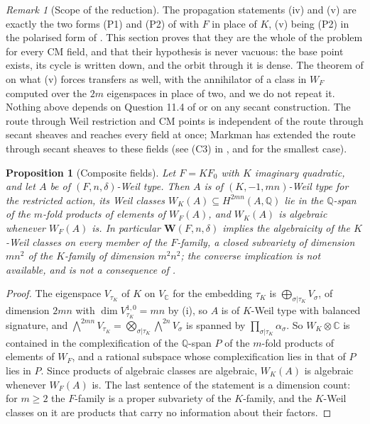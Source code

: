 \documentclass[11pt,reqno]{amsart}
\theoremstyle{plain}
\newtheorem{proposition}[theorem]{Proposition}
\theoremstyle{definition}
\theoremstyle{remark}
\newtheorem{remark}[theorem]{Remark}
\newcommand{\QQ}{\mathbb{Q}}
\newcommand{\CC}{\mathbb{C}}
\begin{document}
\begin{remark}[Scope of the reduction]\label{rem:cmwhatisnew}
The propagation statements (iv) and (v) are exactly the two forms (P1) and
(P2) of \cite[Remark~3.7]{paperII} with $F$ in place of $K$, (v) being (P2) in the
polarised form of \cite[Remark~3.6]{paperII}. This section proves that they are the
whole of the problem for every CM field, and that their hypothesis is never
vacuous: the base point exists, its cycle is written down, and the orbit
through it is dense. The theorem of \cite[Theorem~2.5]{paperII} on what (v) forces
transfers as well, with the annihilator of a class in $W_{F}$ computed over
the $2m$ eigenspaces in place of two, and we do not repeat it. Nothing above
depends on Question 11.4 of \cite{Mar25b} or on any secant construction. The
route through Weil restriction and CM points is independent of the route
through secant sheaves and reaches every field at once; Markman has extended
the route through secant sheaves to these fields \cite{Mar25c} (see (C3) in
\cite[Section~2.5]{paperIII}, and \cite[Section~5.2]{paperII} for the smallest case).
\end{remark}

\begin{proposition}[Composite fields]\label{prop:composite}
Let $F=KF_{0}$ with $K$ imaginary quadratic, and let $A$ be of
$(F,n,\delta)$-Weil type. Then $A$ is of $(K,-1,mn)$-Weil type for the
restricted action, its Weil classes $W_{K}(A)\subseteq H^{2mn}(A,\QQ)$ lie in
the $\QQ$-span of the $m$-fold products of elements of $W_{F}(A)$, and
$W_{K}(A)$ is algebraic whenever $W_{F}(A)$ is. In particular
$\mathbf{W}(F,n,\delta)$ implies the algebraicity of the $K$-Weil classes on
every member of the $F$-family, a closed subvariety of dimension $mn^{2}$ of
the $K$-family of dimension $m^{2}n^{2}$; the converse implication is not
available, and  is not a consequence of
.
\end{proposition}

\begin{proof}
The eigenspace $V_{\tau_{K}}$ of $K$ on $V_{\CC}$ for the embedding
$\tau_{K}$ is $\bigoplus_{\sigma|\tau_{K}}V_{\sigma}$, of dimension $2mn$
with $\dim V_{\tau_{K}}^{1,0}=mn$ by (i), so $A$ is of
$K$-Weil type with balanced signature, and
$\bigwedge^{2mn}V_{\tau_{K}}=\bigotimes_{\sigma|\tau_{K}}\bigwedge^{2n}V_{\sigma}$
is spanned by $\prod_{\sigma|\tau_{K}}\alpha_{\sigma}$. So
$W_{K}\otimes\CC$ is contained in the complexification of the $\QQ$-span $P$ of
the $m$-fold products of elements of $W_{F}$, and a rational subspace whose
complexification lies in that of $P$ lies in $P$. Since products of
algebraic classes are algebraic, $W_{K}(A)$ is algebraic whenever $W_{F}(A)$
is. The last sentence of the statement is a dimension count:
for $m\ge2$ the $F$-family is a proper subvariety of the $K$-family, and the
$K$-Weil classes on it are products that carry no information about their
factors.
\end{proof}
\end{document}
